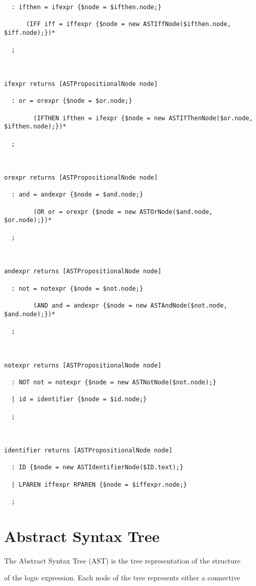 \documentclass{report}
\begin{document}
\begin{verbatim}
  : ifthen = ifexpr {$node = $ifthen.node;} 

	  (IFF iff = iffexpr {$node = new ASTIffNode($ifthen.node, $iff.node);})*

  ;

  	

ifexpr returns [ASTPropositionalNode node]

  : or = orexpr {$node = $or.node;} 

		(IFTHEN ifthen = ifexpr {$node = new ASTIfThenNode($or.node, $ifthen.node);})*

  ;



orexpr returns [ASTPropositionalNode node]

  : and = andexpr {$node = $and.node;} 

		(OR or = orexpr {$node = new ASTOrNode($and.node, $or.node);})*

  ;



andexpr returns [ASTPropositionalNode node]

  : not = notexpr {$node = $not.node;} 

		(AND and = andexpr {$node = new ASTAndNode($not.node, $and.node);})*

  ;



notexpr returns [ASTPropositionalNode node]

  : NOT not = notexpr {$node = new ASTNotNode($not.node);}

  | id = identifier {$node = $id.node;}

  ;



identifier returns [ASTPropositionalNode node]

  : ID {$node = new ASTIdentifierNode($ID.text);}

  | LPAREN iffexpr RPAREN {$node = $iffexpr.node;}

  ;

\end{verbatim}



\section{Abstract Syntax Tree}



The Abstract Syntax Tree (AST) is the tree representation of the structure

of the logic expression. Each node of the tree represents either a connective
\end{document}
